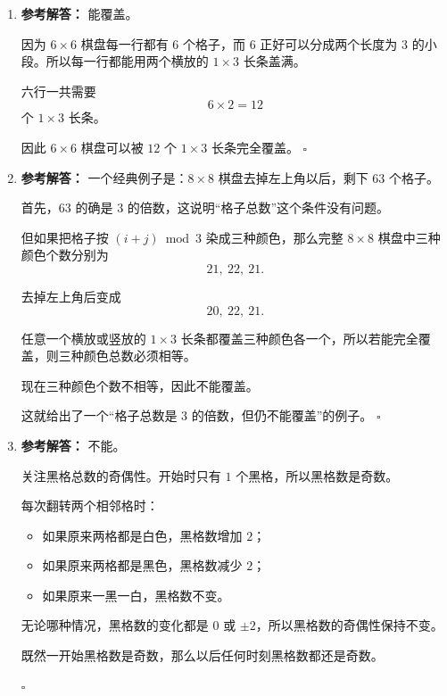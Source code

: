 \documentclass[11pt,a4paper,fontset=fandol]{ctexart}
\newenvironment{solution}{\par\noindent\textbf{参考解答：}}{\hfill$\square$\par}
\begin{document}
\begin{enumerate}
\begin{solution}
  因为 $17$ 是奇数，所以马走了 $17$ 步后，不可能回到与出发点同色的格子。
  \end{solution}

  \item \begin{solution}
  能覆盖。

  因为 $6\times 6$ 棋盘每一行都有 $6$ 个格子，而 $6$ 正好可以分成两个长度为 $3$ 的小段。所以每一行都能用两个横放的 $1\times 3$ 长条盖满。

  六行一共需要
  \[
  6\times 2=12
  \]
  个 $1\times 3$ 长条。

  因此 $6\times 6$ 棋盘可以被 $12$ 个 $1\times 3$ 长条完全覆盖。
  \end{solution}

  \item \begin{solution}
  一个经典例子是：$8\times 8$ 棋盘去掉左上角以后，剩下 $63$ 个格子。

  首先，$63$ 的确是 $3$ 的倍数，这说明“格子总数”这个条件没有问题。

  但如果把格子按 $(i+j)\bmod 3$ 染成三种颜色，那么完整 $8\times 8$ 棋盘中三种颜色个数分别为
  \[
  21,\ 22,\ 21.
  \]

  去掉左上角后变成
  \[
  20,\ 22,\ 21.
  \]

  任意一个横放或竖放的 $1\times 3$ 长条都覆盖三种颜色各一个，所以若能完全覆盖，则三种颜色总数必须相等。

  现在三种颜色个数不相等，因此不能覆盖。

  这就给出了一个“格子总数是 $3$ 的倍数，但仍不能覆盖”的例子。
  \end{solution}

  \item \begin{solution}
  不能。

  关注黑格总数的奇偶性。开始时只有 $1$ 个黑格，所以黑格数是奇数。

  每次翻转两个相邻格时：
  \begin{itemize}
    \item 如果原来两格都是白色，黑格数增加 $2$；
    \item 如果原来两格都是黑色，黑格数减少 $2$；
    \item 如果原来一黑一白，黑格数不变。
  \end{itemize}

  无论哪种情况，黑格数的变化都是 $0$ 或 $\pm 2$，所以黑格数的奇偶性保持不变。

  既然一开始黑格数是奇数，那么以后任何时刻黑格数都还是奇数。


\end{solution}
\end{enumerate}
\end{document}
